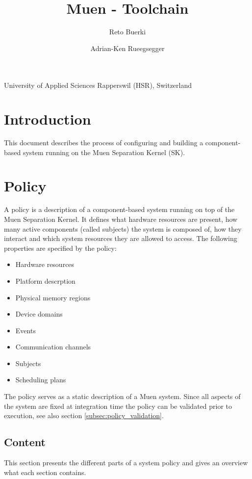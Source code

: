 \documentclass[a4paper,twoside,titlepage]{article}
\title{Muen - Toolchain}
\author{Reto Buerki \and Adrian-Ken Rueegsegger}
\begin{document}


\maketitle

\begin{center}
	University of Applied Sciences Rapperswil (HSR), Switzerland
\end{center}
\clearpage

\tableofcontents
\listoffigures
\lstlistoflistings

\section{Introduction}
This document describes the process of configuring and building a
component-based system running on the Muen Separation Kernel (SK).

\section{Policy}
A policy is a description of a component-based system running on top of the Muen
Separation Kernel. It defines what hardware resources are present, how many
active components (called subjects) the system is composed of, how they interact
and which system resources they are allowed to access. The following properties
are specified by the policy:

\begin{itemize}
	\item Hardware resources
	\item Platform descrption
	\item Physical memory regions
	\item Device domains
	\item Events
	\item Communication channels
	\item Subjects
	\item Scheduling plans
\end{itemize}

The policy serves as a static description of a Muen system. Since all aspects of
the system are fixed at integration time the policy can be validated prior to
execution, see also section \ref{subsec:policy_validation}.

\subsection{Content}
This section presents the different parts of a system policy and gives an
overview what each section contains.
\end{document}
